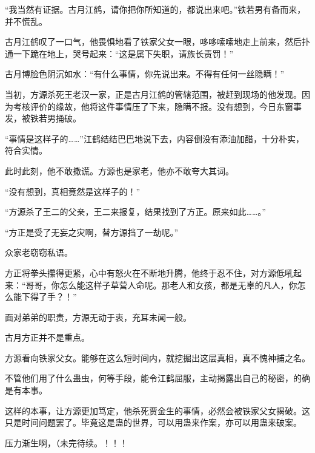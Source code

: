 \begin{this_body}
“我当然有证据。古月江鹤，请你把你所知道的，都说出来吧。”铁若男有备而来，并不慌乱。

古月江鹤叹了一口气，他畏惧地看了铁家父女一眼，哆哆嗦嗦地走上前来，然后扑通一下跪在地上，哭号起来：“这是属下失职，请族长责罚！”

古月博脸色阴沉如水：“有什么事情，你先说出来。不得有任何一丝隐瞒！”

当初，方源杀死王老汉一家，正是古月江鹤的管辖范围，被赶到现场的他发现。因为考核评价的缘故，他将这件事情压了下来，隐瞒不报。没有想到，今日东窗事发，被铁若男捅破。

“事情是这样子的……”江鹤结结巴巴地说下去，内容倒没有添油加醋，十分朴实，符合实情。

此时此刻，他不敢撒谎。方源也是家老，他亦不敢夸大其词。

“没有想到，真相竟然是这样子的！”

“方源杀了王二的父亲，王二来报复，结果找到了方正。原来如此……。”

“方正是受了无妄之灾啊，替方源挡了一劫呢。”

众家老窃窃私语。

方正将拳头攥得更紧，心中有怒火在不断地升腾，他终于忍不住，对方源低吼起来：“哥哥，你怎么能这样子草营人命呢。那老人和女孩，都是无辜的凡人，你怎么能下得了手？！”

面对弟弟的职责，方源无动于衷，充耳未闻一般。

古月方正并不是重点。

方源看向铁家父女。能够在这么短时间内，就挖掘出这层真相，真不愧神捕之名。

不管他们用了什么蛊虫，何等手段，能令江鹤屈服，主动揭露出自己的秘密，的确是有本事。

这样的本事，让方源更加笃定，他杀死贾金生的事情，必然会被铁家父女揭破。这只是时间问题罢了。毕竟这是蛊的世界，可以用蛊来作案，亦可以用蛊来破案。

压力渐生啊，（未完待续。！！！

\end{this_body}

